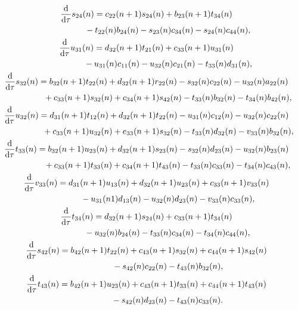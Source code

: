 \documentclass[pdftex]{sigma}
\numberwithin{equation}{section}
\begin{document}
\begin{gather}
	\frac{\mathrm{d}}{\mathrm{d}\tau}s_{24}(n)=c_{22}(n+1)s_{24}(n)+b_{23}(n+1)t_{34}(n)\nonumber\\
\hphantom{\frac{\mathrm{d}}{\mathrm{d}\tau}s_{24}(n)=}{}
	-t_{22}(n)b_{24}(n)-s_{23}(n)c_{34}(n)-s_{24}(n)c_{44}(n),\label{eq-3.8}
\\
	\frac{\mathrm{d}}{\mathrm{d}\tau}u_{31}(n)=d_{32}(n+1)t_{21}(n)+c_{33}(n+1)u_{31}(n)\nonumber\\
\hphantom{\frac{\mathrm{d}}{\mathrm{d}\tau}u_{31}(n)=}{}
	-u_{31}(n)c_{11}(n)-u_{32}(n)c_{21}(n)-t_{33}(n)d_{31}(n), \label{eq-3.9}
\\
	\frac{\mathrm{d}}{\mathrm{d}\tau}s_{32}(n)=b_{32}(n+1)t_{22}(n)+d_{32}(n+1)r_{22}(n)-s_{32}(n)c_{22}(n)-u_{32}(n)a_{22}(n) \nonumber\\
\hphantom{\frac{\mathrm{d}}{\mathrm{d}\tau}s_{32}(n)=}{}
	+c_{33}(n+1)s_{32}(n)+c_{34}(n+1)s_{42}(n)-t_{33}(n)b_{32}(n)-t_{34}(n)b_{42 }(n), \label{eq-3.10}
\\
	\frac{\mathrm{d}}{\mathrm{d}\tau}u_{32}(n)=d_{31}(n+1)t_{12}(n)+d_{32}(n+1)t_{22}(n)-u_{31}(n)c_{12}(n)-u_{32}(n)c_{22}(n) \nonumber\\
\hphantom{\frac{\mathrm{d}}{\mathrm{d}\tau}u_{32}(n)=}{}
	+c_{33}(n+1)u_{32}(n)+e_{33}(n+1)s_{32}(n)-t_{33}(n)d_{32}(n)-v_{33}(n)b_{32}(n),\label{eq-3.11}
\\
	\frac{\mathrm{d}}{\mathrm{d}\tau}t_{33}(n)=b_{32}(n+1)u_{23}(n)+d_{32}(n+1)s_{23}(n)-s_{32}(n)d_{23}(n)-u_{32}(n)b_{23}(n) \nonumber\\
\hphantom{\frac{\mathrm{d}}{\mathrm{d}\tau}t_{33}(n)=}{}
	+c_{33}(n+1)t_{33}(n)+c_{34}(n+1)t_{43}(n)-t_{33}(n)c_{33}(n)-t_{34}(n)c_{43}(n), \label{eq-3.12}
\\
	\frac{\mathrm{d}}{\mathrm{d}\tau}v_{33}(n)=d_{31}(n+1)u_{13}(n)+d_{32}(n+1)u_{23}(n)+c_{33}(n+1)v_{33}(n) \nonumber\\
\hphantom{\frac{\mathrm{d}}{\mathrm{d}\tau}v_{33}(n)=}{}
	-u_{31}(n1)d_{13}(n)-u_{32}(n)d_{23}(n)-v_{33}(n)c_{33}(n), \label{eq-3.13}
\\
	\frac{\mathrm{d}}{\mathrm{d}\tau}t_{34}(n)=d_{32}(n+1)s_{24}(n)+c_{33}(n+1)t_{34}(n)\nonumber\\
\hphantom{\frac{\mathrm{d}}{\mathrm{d}\tau}t_{34}(n)=}{}
	-u_{32}(n)b_{24}(n)-t_{33}(n)c_{34}(n)-t_{34}(n)c_{44}(n), \label{eq-3.14}
\\
	\frac{\mathrm{d}}{\mathrm{d}\tau}s_{42}(n)=b_{42}(n+1)t_{22}(n)+c_{43}(n+1)s_{32}(n)+c_{44}(n+1)s_{42}(n)\nonumber\\
\hphantom{\frac{\mathrm{d}}{\mathrm{d}\tau}s_{42}(n)=}{}
	-s_{42}(n)c_{22}(n)-t_{43}(n)b_{32}(n), \label{eq-3.15}
\\
	\frac{\mathrm{d}}{\mathrm{d}\tau}t_{43}(n)=b_{42}(n+1)u_{23}(n)+c_{43}(n+1)t_{33}(n)+c_{44}(n+1)t_{43}(n)\nonumber\\
\hphantom{\frac{\mathrm{d}}{\mathrm{d}\tau}t_{43}(n)=}{}
	-s_{42}(n)d_{23}(n)-t_{43}(n)c_{33}(n) . \label{eq-3.16}
\end{gather}
\end{document}
